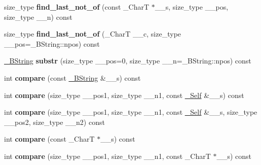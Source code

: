 \begin{DoxyCompactItemize}
\mbox{\label{class____bstr__sum_ac1b0892ccd2cadad4f7e0914db392fb6}} 
size\+\_\+type {\bfseries find\+\_\+last\+\_\+not\+\_\+of} (const \+\_\+\+CharT $\ast$\+\_\+\+\_\+s, size\+\_\+type \+\_\+\+\_\+pos, size\+\_\+type \+\_\+\+\_\+n) const
\item 
\mbox{\label{class____bstr__sum_a11315808dadd4da59e68d1d99125a830}} 
size\+\_\+type {\bfseries find\+\_\+last\+\_\+not\+\_\+of} (\+\_\+\+CharT \+\_\+\+\_\+c, size\+\_\+type \+\_\+\+\_\+pos=\+\_\+\+B\+String\+::npos) const
\item 
\mbox{\label{class____bstr__sum_aa93899eb69ee08f1adcd3196a060bf0c}} 
\hyperlink{classbasic__string}{\+\_\+\+B\+String} {\bfseries substr} (size\+\_\+type \+\_\+\+\_\+pos=0, size\+\_\+type \+\_\+\+\_\+n=\+\_\+\+B\+String\+::npos) const
\item 
\mbox{\label{class____bstr__sum_a78de2cb7b5fbeb6496235a5b224ae1a3}} 
int {\bfseries compare} (const \hyperlink{classbasic__string}{\+\_\+\+B\+String} \&\+\_\+\+\_\+s) const
\item 
\mbox{\label{class____bstr__sum_ac9bffaf7272ff9b71886e017c850ae36}} 
int {\bfseries compare} (size\+\_\+type \+\_\+\+\_\+pos1, size\+\_\+type \+\_\+\+\_\+n1, const \hyperlink{class____bstr__sum}{\+\_\+\+Self} \&\+\_\+\+\_\+s) const
\item 
\mbox{\label{class____bstr__sum_a71560b6deb028324c20fd36816b5324d}} 
int {\bfseries compare} (size\+\_\+type \+\_\+\+\_\+pos1, size\+\_\+type \+\_\+\+\_\+n1, const \hyperlink{class____bstr__sum}{\+\_\+\+Self} \&\+\_\+\+\_\+s, size\+\_\+type \+\_\+\+\_\+pos2, size\+\_\+type \+\_\+\+\_\+n2) const
\item 
\mbox{\label{class____bstr__sum_a5e592b00e41c766722b358d00b6827f4}} 
int {\bfseries compare} (const \+\_\+\+CharT $\ast$\+\_\+\+\_\+s) const
\item 
\mbox{\label{class____bstr__sum_a1782d38f641065583fcc0c0a5b2d826b}} 
int {\bfseries compare} (size\+\_\+type \+\_\+\+\_\+pos1, size\+\_\+type \+\_\+\+\_\+n1, const \+\_\+\+CharT $\ast$\+\_\+\+\_\+s) const
\item 

\end{DoxyCompactItemize}
